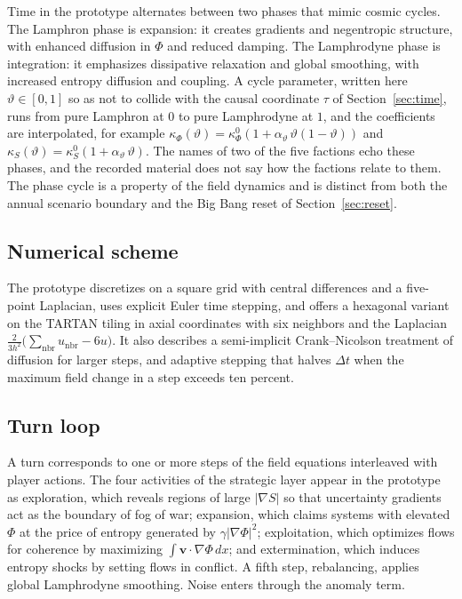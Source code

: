 \documentclass[11pt]{article}
\begin{document}
Time in the prototype alternates between two phases that mimic cosmic cycles. The Lamphron phase is expansion: it creates gradients and negentropic structure, with enhanced diffusion in $\Phi$ and reduced damping. The Lamphrodyne phase is integration: it emphasizes dissipative relaxation and global smoothing, with increased entropy diffusion and coupling. A cycle parameter, written here $\vartheta\in[0,1]$ so as not to collide with the causal coordinate $\tau$ of Section~\ref{sec:time}, runs from pure Lamphron at $0$ to pure Lamphrodyne at $1$, and the coefficients are interpolated, for example $\kappa_\Phi(\vartheta)=\kappa_\Phi^0(1+\alpha_\vartheta\,\vartheta(1-\vartheta))$ and $\kappa_S(\vartheta)=\kappa_S^0(1+\alpha_\vartheta\,\vartheta)$. The names of two of the five factions echo these phases, and the recorded material does not say how the factions relate to them. The phase cycle is a property of the field dynamics and is distinct from both the annual scenario boundary and the Big Bang reset of Section~\ref{sec:reset}.

\subsection{Numerical scheme}

The prototype discretizes on a square grid with central differences and a five-point Laplacian, uses explicit Euler time stepping, and offers a hexagonal variant on the TARTAN tiling in axial coordinates with six neighbors and the Laplacian $\tfrac{2}{3h^2}\big(\sum_{\text{nbr}}u_{\text{nbr}}-6u\big)$. It also describes a semi-implicit Crank--Nicolson treatment of diffusion for larger steps, and adaptive stepping that halves $\Delta t$ when the maximum field change in a step exceeds ten percent.

\subsection{Turn loop}

A turn corresponds to one or more steps of the field equations interleaved with player actions. The four activities of the strategic layer appear in the prototype as exploration, which reveals regions of large $|\nabla S|$ so that uncertainty gradients act as the boundary of fog of war; expansion, which claims systems with elevated $\Phi$ at the price of entropy generated by $\gamma|\nabla\Phi|^2$; exploitation, which optimizes flows for coherence by maximizing $\int \mathbf{v}\cdot\nabla\Phi\,dx$; and extermination, which induces entropy shocks by setting flows in conflict. A fifth step, rebalancing, applies global Lamphrodyne smoothing. Noise enters through the anomaly term.
\end{document}
